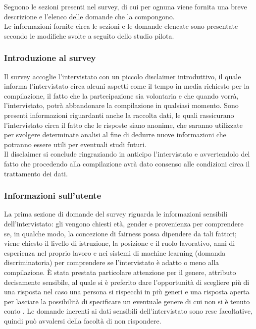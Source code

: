 Seguono le sezioni presenti nel survey, di cui per ognuna viene fornita una breve descrizione e l'elenco delle domande che la compongono.\\
Le informazioni fornite circa le sezioni e le domande elencate sono presentate secondo le modifiche svolte a seguito dello studio pilota.

\subsubsection{Introduzione al survey}

Il survey accoglie l'intervistato con un piccolo disclaimer introduttivo, il quale informa l'intervistato circa alcuni aspetti come il tempo in media richiesto per la compilazione, il fatto che la partecipazione sia volontaria e che quando vorrà, l'intervistato, potrà abbandonare la compilazione in qualsiasi momento. Sono presenti informazioni riguardanti anche la raccolta dati, le quali rassicurano l'intervistato circa il fatto che le risposte siano anonime, che saranno utilizzate per svolgere determinate analisi al fine di dedurre nuove informazioni che potranno essere utili per eventuali studi futuri.\\
Il disclaimer si conclude ringraziando in anticipo l'intervistato e avvertendolo del fatto che procedendo alla compilazione avrà dato consenso alle condizioni circa il trattamento dei dati.

\subsubsection{Informazioni sull'utente}

La prima sezione di domande del survey riguarda le informazioni sensibili dell'intervistato: gli vengono chiesti età, gender e provenienza per comprendere se, in qualche modo, la concezione di fairness possa dipendere da tali fattori; viene chiesto il livello di istruzione, la posizione e il ruolo lavorativo, anni di esperienza nel proprio lavoro e nei sistemi di machine learning (domanda discriminatoria) per comprendere se l'intervistato è adatto o meno alla compilazione. È stata prestata particolare attenzione per il genere, attributo decisamente sensibile, al quale si è preferito dare l'opportunità di scegliere più di una risposta nel caso una persona si rispecchi in più generi e una risposta aperta per lasciare la possibilità di specificare un eventuale genere di cui non si è tenuto conto \cite{genderform}. Le domande inerenti ai dati sensibili dell'intervistato sono rese facoltative, quindi può avvalersi della facoltà di non rispondere.

